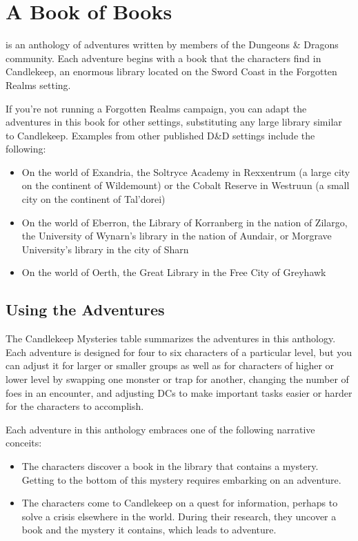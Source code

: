\documentclass[10pt,a4paper,twoside,bg=print,twocolumn,openany,nodeprecatedcode]{dndbook}
\begin{document}
\tableofcontents
\newpage
\chapter{A Book of Books}
 is an anthology of adventures written by members of the Dungeons \& Dragons community. Each adventure begins with a book that the characters find in Candlekeep, an enormous library located on the Sword Coast in the Forgotten Realms setting.


If you're not running a Forgotten Realms campaign, you can adapt the adventures in this book for other settings, substituting any large library similar to Candlekeep. Examples from other published D\&D settings include the following:


\begin{itemize}
\item On the world of Exandria, the Soltryce Academy in Rexxentrum (a large city on the continent of Wildemount) or the Cobalt Reserve in Westruun (a small city on the continent of Tal'dorei)
\item On the world of Eberron, the Library of Korranberg in the nation of Zilargo, the University of Wynarn's library in the nation of Aundair, or Morgrave University's library in the city of Sharn
\item On the world of Oerth, the Great Library in the Free City of Greyhawk
\end{itemize}

\section{Using the Adventures}
The Candlekeep Mysteries table summarizes the adventures in this anthology. Each adventure is designed for four to six characters of a particular level, but you can adjust it for larger or smaller groups as well as for characters of higher or lower level by swapping one monster or trap for another, changing the number of foes in an encounter, and adjusting DCs to make important tasks easier or harder for the characters to accomplish.

Each adventure in this anthology embraces one of the following narrative conceits:


\begin{itemize}
\item The characters discover a book in the library that contains a mystery. Getting to the bottom of this mystery requires embarking on an adventure.
\item The characters come to Candlekeep on a quest for information, perhaps to solve a crisis elsewhere in the world. During their research, they uncover a book and the mystery it contains, which leads to adventure.
\end{itemize}
\end{document}
